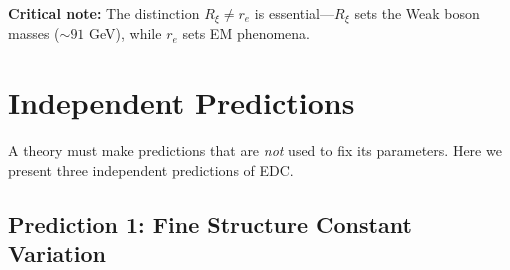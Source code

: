 \textbf{Critical note:} The distinction $R_\xi \neq r_e$ is essential---$R_\xi$ sets the Weak boson masses ($\sim 91$ GeV), while $r_e$ sets EM phenomena.

\newpage

\section{Independent Predictions}
\label{sec:predictions}

A theory must make predictions that are \textit{not} used to fix its parameters. Here we present three independent predictions of EDC.

\subsection{Prediction 1: Fine Structure Constant Variation}

